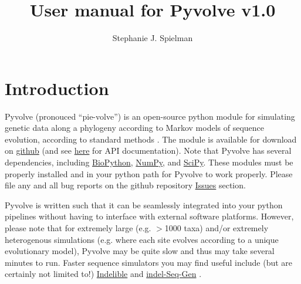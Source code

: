\documentclass{article}
\begin{document}
\title{User manual for Pyvolve v1.0}
\author{Stephanie J. Spielman}
\date{}
\maketitle

\tableofcontents

\section{Introduction}

Pyvolve (pronouced ``pie-volve'') is an open-source python module for simulating genetic data along a phylogeny according to Markov models of sequence evolution, according to standard methods \cite{Yang2006}. The module is available for download on \href{https://github.com/sjspielman/pyvolve/releases}{github} (and see \href{http://sjspielman.org/pyvolve/}{here} for API documentation). Note that Pyvolve has several dependencies, including \href{http://biopython.org/wiki/Download}{BioPython}, \href{http://www.scipy.org/install.html}{NumPy}, and \href{http://www.scipy.org/install.html}{SciPy}. These modules must be properly installed and in your python path for Pyvolve to work properly. Please file any and all bug reports on the github repository \href{https://github.com/sjspielman/pyvolve/issues}{Issues} section.

Pyvolve is written such that it can be seamlessly integrated into your python pipelines without having to interface with external software platforms. However, please note that for extremely large (e.g. $>$1000 taxa) and/or extremely heterogenous simulations (e.g. where each site evolves according to a unique evolutionary model), Pyvolve may be quite slow and thus may take several minutes to run. Faster sequence simulators you may find useful include (but are certainly not limited to!) \href{http://abacus.gene.ucl.ac.uk/software/indelible/}{Indelible} \cite{Fletcher2009} and  \href{http://bioinfolab.unl.edu/~cstrope/iSG/}{indel-Seq-Gen} \cite{Strope2007}. 
\end{document}
